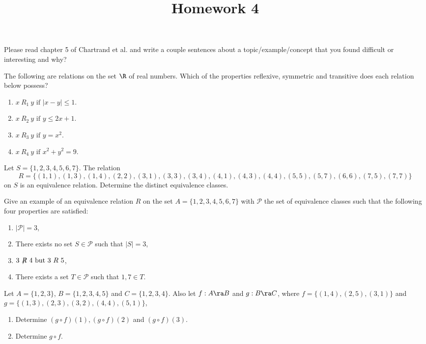 \documentclass{homework}
\title{Homework 4}
\begin{document}
 \maketitle

\question Please read chapter 5 of Chartrand et al. and write a couple sentences about a topic/example/concept that you found difficult or interesting and why?


\question The following are relations on the set $\R$ of real numbers. Which of the properties reflexive, symmetric and transitive does each relation below possess?
\begin{enumerate}[label=(\alph*)]
	\item $x \ R_1 \ y \text{ if } |x - y| \leq 1$.
	\item $x \ R_2 \ y \text{ if } y \leq 2x + 1$.
	\item $x \ R_3 \ y \text{ if } y = x^2$.
	\item $x \ R_4 \ y \text{ if } x^2 + y^2 = 9$.
\end{enumerate}

\question Let $S = \{1,2,3,4,5,6,7\}$. The relation
\[
	R = \{(1, 1),(1, 3),(1, 4),(2, 2),(3, 1),(3, 3),(3, 4),(4, 1),(4, 3),(4, 4),(5, 5),(5, 7),(6, 6),(7, 5),(7, 7)\}
\]
on $S$ is an equivalence relation. Determine the distinct equivalence classes.


\question Give an example of an equivalence relation $R$ on the set $A = \{1, 2, 3, 4, 5, 6, 7\}$ with $\mathcal{P}$ the set of equivalence classes such that the following four properties are satisfied:

\begin{enumerate}
	\item $|\mathcal{P}| = 3$,
	\item There exists no set $S \in \mathcal{P}$ such that $|S| = 3$,
	\item $3 \ \mathord{\not\mathrel{R}} \ 4 \text{ but } 3 \ R \ 5$,
	\item There exists a set $T \in \mathcal{P}$ such that $1, 7 \in T$.
\end{enumerate}

\question Let $A = \{1, 2, 3\}$, $B = \{1, 2, 3, 4, 5\}$ and $C = \{1, 2, 3, 4\}$. Also let $f : A \ra B$ and $g : B \ra C$, where $f = \{(1, 4), (2, 5), (3, 1)\}$ and $g = \{(1, 3), (2, 3), (3, 2), (4, 4), (5, 1)\}$,
\begin{enumerate}[label=(\alph*)]
    \item Determine $(g \circ f )(1), (g \circ f )(2)$ and $(g \circ f )(3)$.
    \item Determine $g \circ f$.
\end{enumerate}
\end{document}
